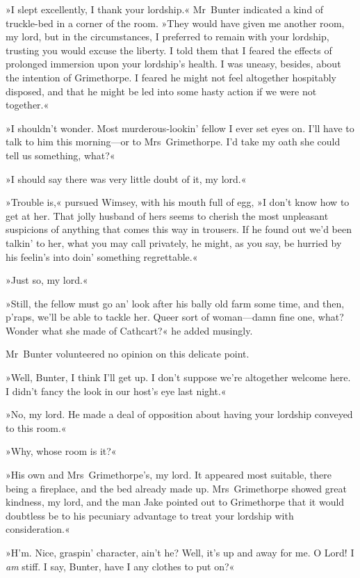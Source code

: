 »I slept excellently, I thank your lordship.« Mr~Bunter indicated a kind of truckle-bed in a corner of the room. »They would have given me another room, my lord, but in the circumstances, I preferred to remain with your lordship, trusting you would excuse the liberty. I told them that I feared the effects of prolonged immersion upon your lordship's health. I was uneasy, besides, about the intention of Grimethorpe. I feared he might not feel altogether hospitably disposed, and that he might be led into some hasty action if we were not together.«

»I shouldn't wonder. Most murderous-lookin' fellow I ever set eyes on.  I'll have to talk to him this morning—or to Mrs~Grimethorpe. I'd take my oath she could tell us something, what?«

»I should say there was very little doubt of it, my lord.«

»Trouble is,« pursued Wimsey, with his mouth full of egg, »I don't know how to get at her. That jolly husband of hers seems to cherish the most unpleasant suspicions of anything that comes this way in trousers. If he found out we'd been talkin' to her, what you may call privately, he might, as you say, be hurried by his feelin's into doin' something regrettable.«

»Just so, my lord.«

»Still, the fellow must go an' look after his bally old farm some time, and then, p'raps, we'll be able to tackle her. Queer sort of woman—damn fine one, what? Wonder what she made of Cathcart?« he added musingly.

Mr~Bunter volunteered no opinion on this delicate point.

»Well, Bunter, I think I'll get up. I don't suppose we're altogether welcome here. I didn't fancy the look in our host's eye last night.«

»No, my lord. He made a deal of opposition about having your lordship conveyed to this room.«

»Why, whose room is it?«

»His own and Mrs~Grimethorpe's, my lord. It appeared most suitable, there being a fireplace, and the bed already made up. Mrs~Grimethorpe showed great kindness, my lord, and the man Jake pointed out to Grimethorpe that it would doubtless be to his pecuniary advantage to treat your lordship with consideration.«

»H'm. Nice, graspin' character, ain't he? Well, it's up and away for me. O Lord! I \textit{am} stiff. I say, Bunter, have I any clothes to put on?«

